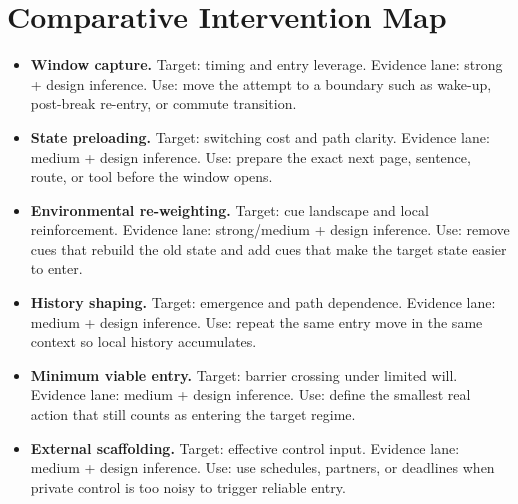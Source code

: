 \section{Comparative Intervention Map}

\begin{itemize}[nosep]
  \item \textbf{Window capture.} Target: timing and entry leverage.
        Evidence lane: strong + design inference.
        Use: move the attempt to a boundary such as wake-up, post-break
        re-entry, or commute transition.
  \item \textbf{State preloading.} Target: switching cost and path clarity.
        Evidence lane: medium + design inference.
        Use: prepare the exact next page, sentence, route, or tool before the
        window opens.
  \item \textbf{Environmental re-weighting.} Target: cue landscape and local
        reinforcement.
        Evidence lane: strong/medium + design inference.
        Use: remove cues that rebuild the old state and add cues that make the
        target state easier to enter.
  \item \textbf{History shaping.} Target: emergence and path dependence.
        Evidence lane: medium + design inference.
        Use: repeat the same entry move in the same context so local history
        accumulates.
  \item \textbf{Minimum viable entry.} Target: barrier crossing under limited
        will.
        Evidence lane: medium + design inference.
        Use: define the smallest real action that still counts as entering the
        target regime.
  \item \textbf{External scaffolding.} Target: effective control input.
        Evidence lane: medium + design inference.
        Use: use schedules, partners, or deadlines when private control is too
        noisy to trigger reliable entry.
\end{itemize}
